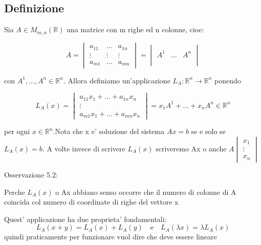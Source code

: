 \documentclass{article}
\begin{document}
\subsection{Definizione}
\begin{flushleft}
	Sia $A \in M_{m,n}(\mathbb{R})$ una matrice con m righe ed n colonne, cioe:
\end{flushleft}
\begin{equation*}
	A = \begin{vmatrix}
		a_{11} & \dots  & a_{1n} \\
		\vdots & \vdots & \vdots \\
		a_{m1} & \dots  & a_{mn}
	\end{vmatrix}=\begin{vmatrix}
		\\
		A^1 & \dots & A^n \\
		\\
	\end{vmatrix}
\end{equation*}
\begin{flushleft}
	con $A^1,...,A^n \in \mathbb{R}^n$. Allora definiamo un'applicazione $L_A: \mathbb{R}^n \to \mathbb{R}^n$ ponendo
\end{flushleft}
\begin{equation*}
	L_A(x) = \begin{vmatrix}
		a_{11}x_1+ \dots + a_{1n}x_n \\
		\vdots                       \\
		a_{m1}x_1+ \dots + a_{mn}x_n
	\end{vmatrix}=x_1A^1+...+x_nA^n \in \mathbb{R}^n
\end{equation*}
\begin{flushleft}
	per ogni $x \in \mathbb{R}^n$.Nota che x e' soluzione del sistema $Ax=b$ se e solo se $L_A(x)=b$.
	A volte invece di scrivere $L_A(x)$ scriveremo Ax o anche $A\begin{vmatrix}
			x_1    \\
			\vdots \\
			x_n
		\end{vmatrix}
	$
\end{flushleft}
Osservazione 5.2:
\begin{flushleft}
	Perche $L_A(x)$ o Ax abbiano senso occorre che il numero di colonne di A coincida col numero di coordinate
	di righe del vettore x
\end{flushleft}
Quest' applicazione ha due proprieta' fondamentali:
\begin{equation*}
	L_A(x+y)=L_A(x)+L_A(y) \quad \text{e} \quad L_A(\lambda x)=\lambda L_A(x)
\end{equation*}
quindi praticamente per funzionare vuol dire che deve essere lineare
\end{document}

